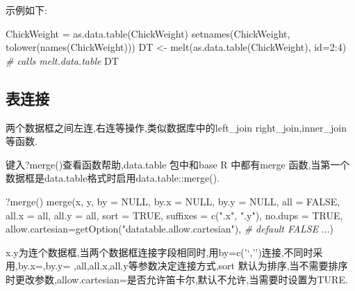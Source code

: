 \documentclass[
]{book}
\newenvironment{Shaded}{\begin{snugshade}}{\end{snugshade}}
\newcommand{\AttributeTok}[1]{\textcolor[rgb]{0.77,0.63,0.00}{#1}}
\newcommand{\CommentTok}[1]{\textcolor[rgb]{0.56,0.35,0.01}{\textit{#1}}}
\newcommand{\ConstantTok}[1]{\textcolor[rgb]{0.00,0.00,0.00}{#1}}
\newcommand{\DecValTok}[1]{\textcolor[rgb]{0.00,0.00,0.81}{#1}}
\newcommand{\FunctionTok}[1]{\textcolor[rgb]{0.00,0.00,0.00}{#1}}
\newcommand{\NormalTok}[1]{#1}
\newcommand{\OtherTok}[1]{\textcolor[rgb]{0.56,0.35,0.01}{#1}}
\newcommand{\SpecialCharTok}[1]{\textcolor[rgb]{0.00,0.00,0.00}{#1}}
\newcommand{\StringTok}[1]{\textcolor[rgb]{0.31,0.60,0.02}{#1}}
\begin{document}
示例如下:

\begin{Shaded}
\begin{Highlighting}[]
\NormalTok{ChickWeight }\OtherTok{=} \FunctionTok{as.data.table}\NormalTok{(ChickWeight)}
\FunctionTok{setnames}\NormalTok{(ChickWeight, }\FunctionTok{tolower}\NormalTok{(}\FunctionTok{names}\NormalTok{(ChickWeight)))}
\NormalTok{DT }\OtherTok{\textless{}{-}} \FunctionTok{melt}\NormalTok{(}\FunctionTok{as.data.table}\NormalTok{(ChickWeight), }\AttributeTok{id=}\DecValTok{2}\SpecialCharTok{:}\DecValTok{4}\NormalTok{) }\CommentTok{\# calls melt.data.table}
\NormalTok{DT}
\end{Highlighting}
\end{Shaded}

\hypertarget{ux8868ux8fdeux63a5}{%
\subsection{表连接}\label{ux8868ux8fdeux63a5}}

两个数据框之间左连,右连等操作,类似数据库中的left\_join right\_join,inner\_join 等函数.

键入?merge()查看函数帮助,data.table 包中和base R 中都有merge 函数,当第一个数据框是data.table格式时启用data.table::merge().

\begin{Shaded}
\begin{Highlighting}[]
\NormalTok{?}\FunctionTok{merge}\NormalTok{()}
\FunctionTok{merge}\NormalTok{(x, y, }\AttributeTok{by =} \ConstantTok{NULL}\NormalTok{, }\AttributeTok{by.x =} \ConstantTok{NULL}\NormalTok{, }\AttributeTok{by.y =} \ConstantTok{NULL}\NormalTok{, }\AttributeTok{all =} \ConstantTok{FALSE}\NormalTok{,}
\AttributeTok{all.x =}\NormalTok{ all, }\AttributeTok{all.y =}\NormalTok{ all, }\AttributeTok{sort =} \ConstantTok{TRUE}\NormalTok{, }\AttributeTok{suffixes =} \FunctionTok{c}\NormalTok{(}\StringTok{".x"}\NormalTok{, }\StringTok{".y"}\NormalTok{), }\AttributeTok{no.dups =} \ConstantTok{TRUE}\NormalTok{,}
\AttributeTok{allow.cartesian=}\FunctionTok{getOption}\NormalTok{(}\StringTok{"datatable.allow.cartesian"}\NormalTok{),  }\CommentTok{\# default FALSE}
\NormalTok{...)}
\end{Highlighting}
\end{Shaded}

x.y为连个数据框,当两个数据框连接字段相同时,用by=c('`,'')连接,不同时采用,by.x=,by.y= ,all,all.x,all.y等参数决定连接方式,sort 默认为排序,当不需要排序时更改参数,allow.cartesian=是否允许笛卡尔,默认不允许,当需要时设置为TURE.
\end{document}
